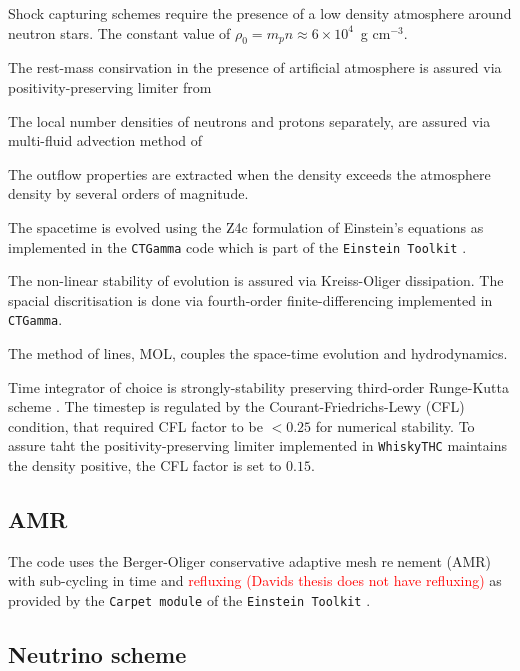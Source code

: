 \documentclass[11pt,a4paper,headinclude=true,DIV=14,BCOR=8mm,chapterprefix,listof=totoc,twoside,openright,abstracton]{scrbook}
\newcommand{\red}[1]{\textcolor{red}{#1}}
\newcommand{\gcm}{g cm$^{-3}$}
\begin{document}
Shock capturing schemes require the presence of a low density atmosphere around neutron stars.
The constant value of $\rho_0 = m_p n \approx 6\times 10^4$~\gcm.

The rest-mass consirvation in the presence of artificial atmosphere is assured via 
positivity-preserving limiter from \cite{Radice:2013xpa}

The local number densities of neutrons and protons separately, are assured via 
multi-fluid advection method of \cite{Plewa:1998nma}

The outflow properties are extracted when the density exceeds the atmosphere density
by several orders of magnitude.

The spacetime is evolved using the Z4c formulation of Einstein's equations
\cite{Bernuzzi:2009ex,Hilditch:2012fp} as implemented in the \texttt{CTGamma} code
\cite{Pollney:2009yz,Reisswig:2013sqa} which is part of the \texttt{Einstein Toolkit} 
\cite{Loffler:2011ay}.

The non-linear stability of evolution is assured via Kreiss-Oliger dissipation. 
The spacial discritisation is done via fourth-order finite-differencing implemented in \texttt{CTGamma}.

The method of lines, MOL, couples the space-time evolution and hydrodynamics. 

Time integrator of choice is strongly-stability preserving third-order Runge-Kutta scheme \cite{Gottlieb:2009}.
The timestep is regulated by the Courant-Friedrichs-Lewy (CFL) condition, that required CFL factor 
to be $<0.25$ for numerical stability. To assure taht the positivity-preserving limiter implemented in \texttt{WhiskyTHC} maintains the density positive, the CFL factor is set to $0.15$.


\subsection{AMR}

The code uses the Berger-Oliger conservative adaptive mesh renement (AMR) \cite{Berger:1984} with 
sub-cycling in time and \red{refluxing (Davids thesis does not have refluxing)} \cite{Berger:1989,Reisswig:2012nc} as provided by the \texttt{Carpet module} of the \texttt{Einstein Toolkit} 
\cite{Schnetter:2003rb}. 



\subsection{Neutrino scheme}
\end{document}
